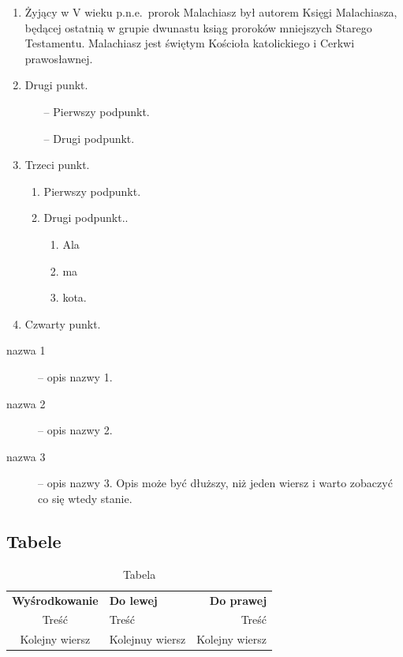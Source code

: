 \documentclass[12pt,a4paper]{article}
\begin{document}
\begin{enumerate}
\item Żyjący w V wieku p.n.e.~prorok Malachiasz był autorem Księgi Malachiasza, będącej
  ostatnią w grupie dwunastu ksiąg proroków mniejszych Starego Testamentu. Malachiasz jest
  świętym Kościoła katolickiego i Cerkwi prawosławnej.
\item Drugi punkt.
  \begin{itemize}
  \item[--] Pierwszy podpunkt.
  \item[--] Drugi podpunkt.
  \end{itemize}
\item Trzeci punkt.
  \begin{enumerate}
  \item Pierwszy podpunkt.
  \item Drugi podpunkt..
    \begin{enumerate}
    \item Ala
    \item ma
    \item kota.
    \end{enumerate}
  \end{enumerate}
\item Czwarty punkt.
\end{enumerate}

\begin{description}
\item[nazwa 1] -- opis nazwy 1.
\item[nazwa 2] -- opis nazwy 2.
\item[nazwa 3] -- opis nazwy 3.  Opis może być dłuższy, niż jeden wiersz i warto
  zobaczyć co się wtedy stanie.
\end{description}

\subsection{Tabele}

\begin{table}[htb]
  \begin{tabular}{clr}
  {\bf Wyśrodkowanie} & {\bf Do lewej} & {\bf Do prawej} \\
  Treść & Treść & Treść \\
  Kolejny wiersz & Kolejnuy wiersz & Kolejny wiersz \\
  \end{tabular}
\caption{Tabela}
\label{tab:bez_ramek}
\end{table}
\end{document}
